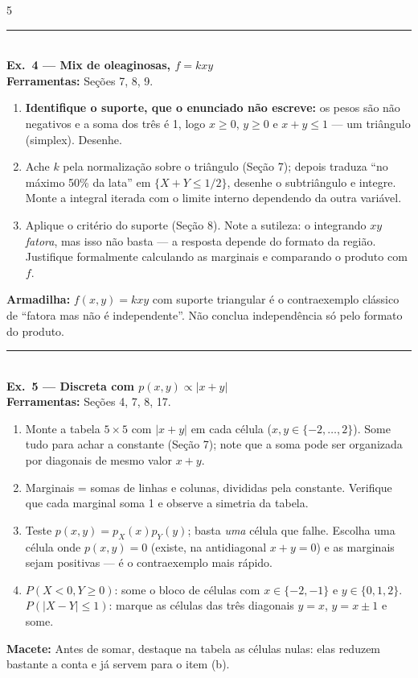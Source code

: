 \documentclass[a4paper,8pt]{extarticle}
\newcommand{\tit}[1]{\vspace{2pt}\textcolor{azul}{\rule{\linewidth}{0.6pt}}\\[1pt]\textbf{\textcolor{azul}{#1}}\\[1pt]}
\newcommand{\mac}[1]{\textcolor{verde}{\textbf{Macete:}} #1\par}
\newcommand{\arm}[1]{\textcolor{vinho}{\textbf{Armadilha:}} #1\par}
\newcommand{\ferr}[1]{\textbf{Ferramentas:} #1\par}
\begin{document}
\begin{multicols*}{5}
\tit{Ex.\ 4 — Mix de oleaginosas, $f=kxy$}
\ferr{Seções 7, 8, 9.}
\begin{enumerate}
\item[0.] \textbf{Identifique o suporte, que o enunciado não escreve:} os pesos são não negativos e a soma dos três é 1, logo $x\ge0$, $y\ge0$ e $x+y\le1$ — um triângulo (simplex). Desenhe.
\item[(a)] Ache $k$ pela normalização sobre o triângulo (Seção 7); depois traduza “no máximo 50\% da lata” em $\{X+Y\le 1/2\}$, desenhe o subtriângulo e integre. Monte a integral iterada com o limite interno dependendo da outra variável.
\item[(b)] Aplique o critério do suporte (Seção 8). Note a sutileza: o integrando $xy$ \emph{fatora}, mas isso não basta — a resposta depende do formato da região. Justifique formalmente calculando as marginais e comparando o produto com $f$.
\end{enumerate}
\arm{$f(x,y)=kxy$ com suporte triangular é o contraexemplo clássico de “fatora mas não é independente”. Não conclua independência só pelo formato do produto.}

\tit{Ex.\ 5 — Discreta com $p(x,y)\propto|x+y|$}
\ferr{Seções 4, 7, 8, 17.}
\begin{enumerate}
\item Monte a tabela $5\times5$ com $|x+y|$ em cada célula ($x,y\in\{-2,\dots,2\}$). Some tudo para achar a constante (Seção 7); note que a soma pode ser organizada por diagonais de mesmo valor $x+y$.
\item[(a)] Marginais = somas de linhas e colunas, divididas pela constante. Verifique que cada marginal soma 1 e observe a simetria da tabela.
\item[(b)] Teste $p(x,y)=p_X(x)p_Y(y)$; basta \emph{uma} célula que falhe. Escolha uma célula onde $p(x,y)=0$ (existe, na antidiagonal $x+y=0$) e as marginais sejam positivas — é o contraexemplo mais rápido.
\item[(c)] $P(X<0,Y\ge0)$: some o bloco de células com $x\in\{-2,-1\}$ e $y\in\{0,1,2\}$. $P(|X-Y|\le1)$: marque as células das três diagonais $y=x$, $y=x\pm1$ e some.
\end{enumerate}
\mac{Antes de somar, destaque na tabela as células nulas: elas reduzem bastante a conta e já servem para o item (b).}


\end{multicols*}
\end{document}
